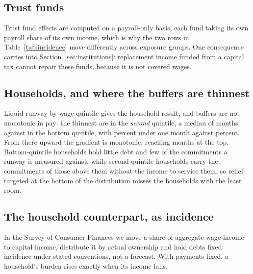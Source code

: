 \subsection{Trust funds}

Trust fund effects are computed on a payroll-only basis, each fund taking its own payroll share of its own income, which is why the two rows in Table~\ref{tab:incidence} move differently across exposure groups. One consequence carries into Section~\ref{sec:institutions}: replacement income funded from a capital tax cannot repair these funds, because it is not covered wages.


\subsection{Households, and where the buffers are thinnest}

Liquid runway by wage quintile gives the household result, and buffers are not monotonic in pay:
the thinnest are in the \emph{second} quintile, a median of  months against
 in the bottom quintile, with  percent under one month
against  percent. From there upward the gradient is monotonic, reaching
 months at the top. Bottom-quintile households hold little debt and few of the
commitments a runway is measured against, while second-quintile households carry the commitments
of those above them without the income to service them, so relief targeted at the bottom of the
distribution misses the households with the least room.

\begin{table}[htbp]
\centering
\caption{Liquid runway of working households by wage quintile: months of income covered by liquid
assets, and the share with less than one month. Measured.}
\label{tab:buffers}

\end{table}

\subsection{The household counterpart, as incidence}

In the Survey of Consumer Finances we move a share of aggregate wage income to capital
income, distribute it by actual ownership and hold debts fixed: incidence under stated
conventions, not a forecast. With payments fixed, a household's burden rises exactly when
its income falls.

